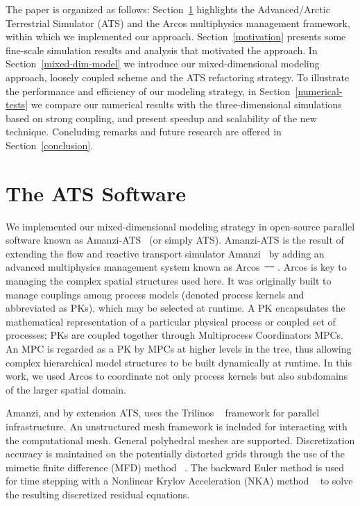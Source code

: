 \documentclass[review,11pt]{elsarticle}
\providecommand{\DIFadd}[1]{{\protect\color{blue}\uwave{#1}}} %
\providecommand{\DIFdel}[1]{{\protect\color{red}\sout{#1}}}                      %
\providecommand{\DIFaddbegin}{} %
\providecommand{\DIFaddend}{} %
\providecommand{\DIFdelbegin}{} %
\providecommand{\DIFdelend}{} %
\begin{document}
The paper is organized as follows: Section~\ref{arcos-framework} highlights the Advanced/Arctic  Terrestrial Simulator (ATS) and the Arcos multiphysics management framework, within which we implemented our approach. Section~\ref{motivation} presents some fine-scale simulation results and analysis that motivated the approach.  In Section~\ref{mixed-dim-model} we introduce our mixed-dimensional modeling approach, loosely coupled scheme and the ATS refactoring strategy. To illustrate the performance and efficiency of our modeling strategy, in Section~\ref{numerical-tests} we compare our numerical results with the three-dimensional simulations based on strong coupling, and present speedup and scalability of the new technique. Concluding remarks and future research are offered in Section~\ref{conclusion}.

\section{The ATS Software}\label{arcos-framework}

We implemented our mixed-dimensional modeling strategy in open-source parallel software known as Amanzi-ATS~\cite{ats-website} (or simply ATS). Amanzi-ATS is the result of extending the flow and reactive transport  simulator Amanzi~\cite{moulton2012high} by adding an advanced multiphysics management system known as Arcos~\DIFdelbegin \DIFdel{\mbox{%
\cite{ecoon2016managing}
}%
}\DIFdelend \DIFaddbegin \DIFadd{\mbox{%
\cite{coon2016managing}
}%
}\DIFaddend . Arcos is key to managing the complex spatial structures used here. It was originally built to manage couplings among process models (denoted process kernels and abbreviated as PKs), which may be selected at runtime. A PK encapsulates the mathematical representation of a particular physical process or coupled set of processes; PKs are coupled together through Multiprocess Coordinators MPCs. An MPC is regarded as a PK by MPCs at higher levels in the tree, thus allowing complex hierarchical model structures to be built dynamically at runtime. In this work, we used Arcos to coordinate not only process kernels but also subdomains of the larger spatial domain. 

Amanzi, and by extension ATS, uses the Trilinos ~\cite{michael2003trilinos} framework for parallel infrastructure. An unstructured mesh framework \cite{garimella-2014-mstk} is included for interacting with the computational mesh. General polyhedral meshes are supported. Discretization accuracy is maintained on the potentially distorted grids through the use of the mimetic finite difference (MFD) method ~\cite{da2014mimetic, lipnikov2014mimetic}. The backward Euler method is used for time stepping with a Nonlinear Krylov Acceleration (NKA) method ~\cite{calef2013nonlinear, carlson1998design} to solve the resulting discretized residual equations. 
\end{document}
